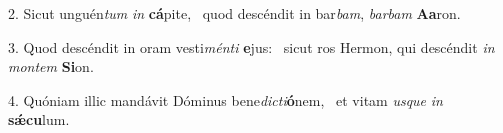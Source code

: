 2. Sicut unguén\textit{tum} \textit{in} \textbf{cá}pite, \ast\  quod descéndit in bar\textit{bam}, \textit{bar}\textit{bam} \textbf{A}\textbf{a}ron.\

3. Quod descéndit in oram vesti\textit{mén}\textit{ti} \textbf{e}jus: \ast\  sicut ros Hermon, qui descéndit \textit{in} \textit{mon}\textit{tem} \textbf{Si}on.\

4. Quóniam illic mandávit Dóminus bene\textit{dic}\textit{ti}\textbf{ó}nem, \ast\  et vitam \textit{us}\textit{que} \textit{in} \textbf{sǽ}\textbf{cu}lum.\

